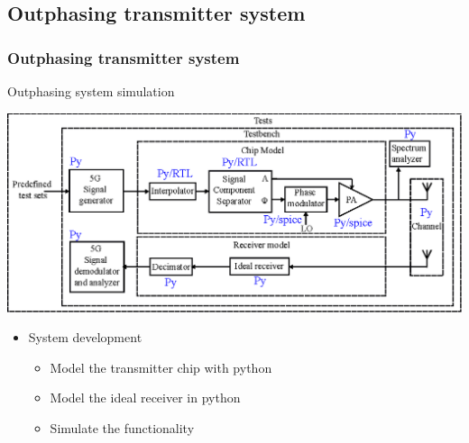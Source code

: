 \documentclass{sdkslides}
\begin{document}

\renewcommand{\sectionname}{Outphasing transmitter system}
\subsection*{\sectionname}
\begin{frame}[c]
    \frametitle{\sectionname}
    \begin{block}{Outphasing system simulation}
        \begin{center}
            \includegraphics[width=\textwidth]{Pics/outphasing_model.eps}
        \end{center}
    \end{block}    \begin{itemize}
        \item System development
            \begin{itemize}
                \item  Model the transmitter chip with python
                \item  Model the ideal receiver in python
                \item  Simulate the functionality
            \end{itemize}
    \end{itemize}
\end{frame}
\end{document}
